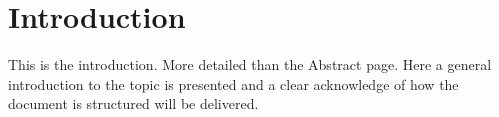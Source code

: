\chapter{Introduction}
This is the introduction. %
More detailed than the Abstract page. Here a general introduction to the topic is presented and a clear acknowledge of how the document is structured will be delivered.
